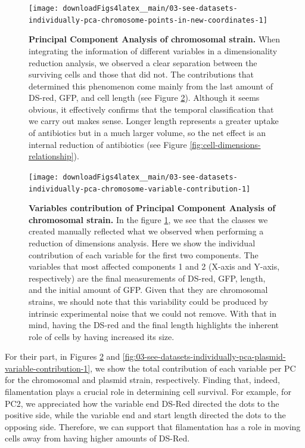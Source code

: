 \documentclass[a4paper, nobind]{templates/ociamthesis}
\begin{document}
\begin{figure}[H]
\texttt{[image: downloadFigs4latex\_\_main/03-see-datasets-individually-pca-chromosome-points-in-new-coordinates-1]} \caption[Principal Component Analysis of chromosomal strain.]{\textbf{Principal Component Analysis of chromosomal strain.} When integrating the information of different variables in a dimensionality reduction analysis, we observed a clear separation between the surviving cells and those that did not. The contributions that determined this phenomenon come mainly from the last amount of DS-red, GFP, and cell length (see Figure \ref{fig:03-see-datasets-individually-pca-chromosome-variable-contribution-1}). Although it seems obvious, it effectively confirms that the temporal classification that we carry out makes sense. Longer length represents a greater uptake of antibiotics but in a much larger volume, so the net effect is an internal reduction of antibiotics (see Figure \ref{fig:cell-dimensions-relationship}).}\label{fig:03-see-datasets-individually-pca-chromosome-points-in-new-coordinates-1}
\end{figure}





\begin{figure}[H]
\texttt{[image: downloadFigs4latex\_\_main/03-see-datasets-individually-pca-chromosome-variable-contribution-1]} \caption[Variables contribution of Principal Component Analysis of chromosomal strain.]{\textbf{Variables contribution of Principal Component Analysis of chromosomal strain.} In the figure \ref{fig:03-see-datasets-individually-pca-chromosome-points-in-new-coordinates-1}, we see that the classes we created manually reflected what we observed when performing a reduction of dimensions analysis. Here we show the individual contribution of each variable for the first two components. The variables that most affected components 1 and 2 (X-axis and Y-axis, respectively) are the final measurements of DS-red, GFP, length, and the initial amount of GFP. Given that they are chromosomal strains, we should note that this variability could be produced by intrinsic experimental noise that we could not remove. With that in mind, having the DS-red and the final length highlights the inherent role of cells by having increased its size.}\label{fig:03-see-datasets-individually-pca-chromosome-variable-contribution-1}
\end{figure}

For their part, in Figures \ref{fig:03-see-datasets-individually-pca-chromosome-variable-contribution-1} and \ref{fig:03-see-datasets-individually-pca-plasmid-variable-contribution-1}, we show the total contribution of each variable per PC for the chromosomal and plasmid strain, respectively.
Finding that, indeed, filamentation plays a crucial role in determining cell survival.
For example, for PC2, we appreciated how the variable end DS-Red directed the dots to the positive side, while the variable end and start length directed the dots to the opposing side.
Therefore, we can support that filamentation has a role in moving cells away from having higher amounts of DS-Red.
\end{document}
